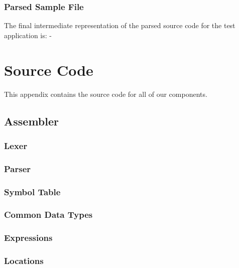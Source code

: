 \documentclass[a4paper,11pt]{report}
\begin{document}
\begin{appendices}
\subsection{Parsed Sample File}
The final intermediate representation of the parsed source code for the test application is: -


\chapter{Source Code}
This appendix contains the source code for all of our components.
\section{Assembler}\label{source:assembler}
\subsection{Lexer}\label{source:lexer}

\subsection{Parser}\label{source:parser}

\subsection{Symbol Table}\label{source:SymbolTable}

\subsection{Common Data Types}\label{source:DataTypes}

\subsection{Expressions}\label{source:Expressions}

\subsection{Locations}\label{source:locations}


\end{appendices}
\end{document}
